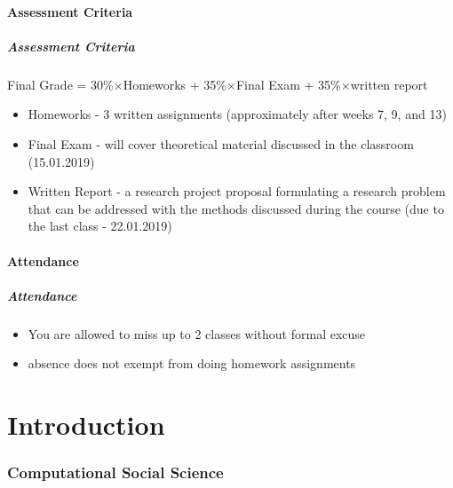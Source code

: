 \subsection[Assessment]{Assessment Criteria}
\begin{frame}
    \frametitle{Assessment Criteria}
    \begin{block}{}
        Final Grade = 30\%$\times$Homeworks + 35\%$\times$Final Exam + 35\%$\times$written report\\
    \end{block}
        \begin{itemize}
        \item Homeworks - 3 written assignments (approximately after weeks 7, 9, and 13)
        \item Final Exam - will cover theoretical material discussed in the classroom (15.01.2019)
        \item Written Report - a research project proposal formulating a research problem that can be addressed with the methods discussed during the course (due to the last class - 22.01.2019)
    \end{itemize}
\end{frame}

\subsection[Attendance]{Attendance}
\begin{frame}
    \frametitle{Attendance}
    \begin{itemize}
        \item You are allowed to miss up to 2 classes without formal excuse
        \item  absence does not exempt from doing homework assignments
    \end{itemize}
\end{frame}


\part[Introduction]{Introduction}
\frame{\partpage}

\section[CSS]{Computational Social Science}

